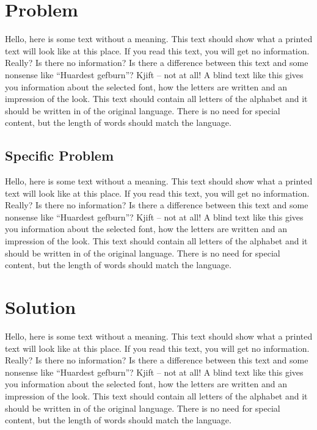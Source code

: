 \documentclass[%
  english,%
  todotools=true,%
  trtype=inproceedings%
]{hpitr}
\begin{document}
\section{Problem}
\label{sec:problem}

Hello, here is some text without a meaning. This text should show
what a printed text will look like at this place. If you read this
text, you will get no information. Really? Is there no information?
Is there a difference between this text and some nonsense like
“Huardest gefburn”? Kjift – not at all! A blind text like this gives
you information about the selected font, how the letters are written
and an impression of the look. This text should contain all letters
of the alphabet and it should be written in of the original
language. There is no need for special content, but the length of
words should match the language.~\cite{953350}

\subsection{Specific Problem}
\label{sec:specific-problem}

Hello, here is some text without a meaning. This text should show
what a printed text will look like at this place. If you read this
text, you will get no information. Really? Is there no information?
Is there a difference between this text and some nonsense like
“Huardest gefburn”? Kjift – not at all! A blind text like this gives
you information about the selected font, how the letters are written
and an impression of the look. This text should contain all letters
of the alphabet and it should be written in of the original
language. There is no need for special content, but the length of
words should match the language.

\section{Solution}
\label{sec:solution}

%
Hello, here is some text without a meaning. This text should show
what a printed text will look like at this place. If you read this
text, you will get no information. Really? Is there no information?
Is there a difference between this text and some nonsense like
“Huardest gefburn”? Kjift – not at all! A blind text like this gives
you information about the selected font, how the letters are written
and an impression of the look. This text should contain all letters
of the alphabet and it should be written in of the original
language. There is no need for special content, but the length of
words should match the language.
\end{document}
